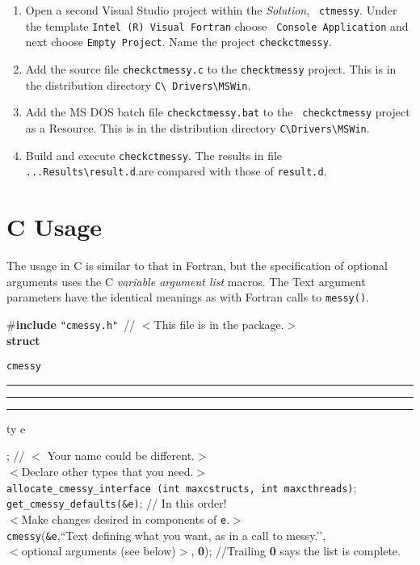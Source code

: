 \documentclass[12pt]{article}
\DeclareRobustCommand{\us}{\rule{.2pt}{0pt}\rule[-.8pt]{.4em}{.5pt}%
\rule{.2pt}{0pt}}
\DeclareRobustCommand{\us}{\rule{.2pt}{0pt}\rule[-.8pt]{.4em}{.5pt}%
\rule{.2pt}{0pt}}
\begin{document}
\begin{description}
  \begin{enumerate}
  \item Open a second Visual Studio project within the {\em Solution}, {\tt
      ctmessy}.  Under the template {\tt Intel (R) Visual Fortran} choose {\tt
      Console Application} and next choose {\tt Empty Project}.  Name the
    project {\tt checkctmessy}.

  \item Add the source file {\tt checkctmessy.c} to the {\tt checktmessy}
    project.  This is in the distribution directory {\tt C\textbackslash
      Drivers\textbackslash MSWin}.

  \item Add the MS DOS batch file {\tt checkctmessy.bat} to the {\tt
      checkctmessy} project as a Resource.  This is in the distribution
    directory {\tt C\textbackslash Drivers\textbackslash MSWin}.
  \item Build and execute {\tt checkctmessy}.  The results in file 
      {\tt ...Results\textbackslash result.d}.are compared with those of {\tt result.d}.
  \end {enumerate}
 
\end{description}

\section{C Usage}
\label{sec:usage-c}

The usage in C is similar to that in Fortran, but the specification of optional
arguments uses the C {\it variable argument list} macros.  The Text argument
parameters have the identical meanings as with Fortran calls to {\tt messy()}.
\begin{tabbing}
  \#{\bf include} \verb:"cmessy.h":\ // $<$This file is in the package.$>$\\
  {\bf struct} {\tt cmessy\us ty e}; // $<$ Your name could be different.$>$\\
  $<$Declare other types that you need.$>$\\
  {\tt allocate\_cmessy\_interface (int maxcstructs, int maxcthreads)};\\
  {\tt get\_cmessy\_defaults(\&e)}; // In this order!\\
  $<$Make changes desired in components of {\tt e}.$>$\\
  {\tt cmessy}({\tt \&e},``Text defining what you want, as in a call to
  messy.\rq{}\rq{},\\
  $<$optional arguments (see below)$>$, {\bf 0});  //Trailing {\bf 0} says the
  list is complete.\\
\end{tabbing}\vspace{-15pt}
\end{document}
